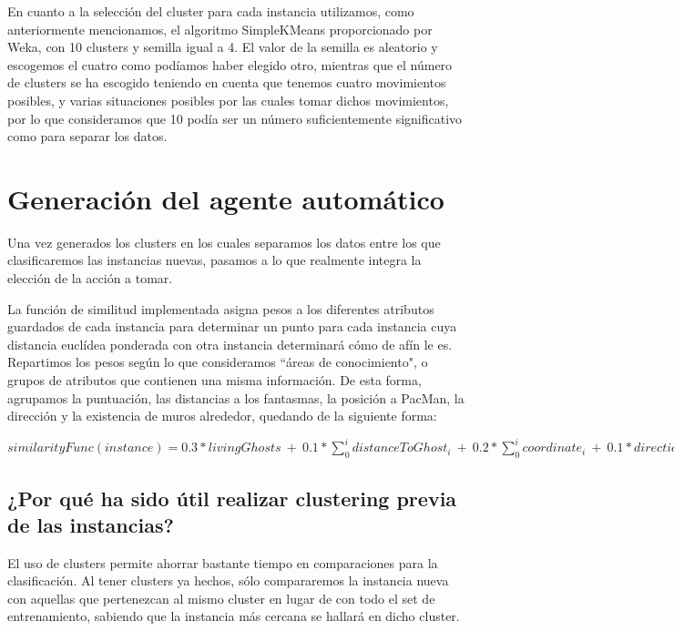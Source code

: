 \documentclass[12pt]{article}
\begin{document}
En cuanto a la selección del cluster para cada instancia utilizamos, como anteriormente mencionamos, el algoritmo SimpleKMeans proporcionado por Weka, con 10 clusters y semilla igual a 4. El valor de la semilla es aleatorio y escogemos el cuatro como podíamos haber elegido otro, mientras que el número de clusters se ha escogido teniendo en cuenta que tenemos cuatro movimientos posibles, y varias situaciones posibles por las cuales tomar dichos movimientos, por lo que consideramos que 10 podía ser un número suficientemente significativo como para separar los datos.

\section{Generación del agente automático}

Una vez generados los clusters en los cuales separamos los datos entre los que clasificaremos las instancias nuevas, pasamos a lo que realmente integra la elección de la acción a tomar.


La función de similitud implementada asigna pesos a los diferentes atributos guardados de cada instancia para determinar un punto para cada instancia cuya distancia euclídea ponderada con otra instancia determinará cómo de afín le es. Repartimos los pesos según lo que consideramos ``áreas de conocimiento", o grupos de atributos que contienen una misma información. De esta forma, agrupamos la puntuación, las distancias a los fantasmas, la posición a PacMan, la dirección y la existencia de muros alrededor, quedando de la siguiente forma:
\begin{center}
    $ similarityFunc(instance) = 0.3 * livingGhosts\ +\ 0.1 * \sum\limits_{0}^{i} distanceToGhost_i\ +\ 0.2 * \sum\limits_{0}^{i} coordinate_i\ +\ 0.1 * directionValue\ +\ 0.3 * \sum\limits_{0}^{i} thereIsWall_i $
\end{center}

\newpage

\subsection{¿Por qué ha sido útil realizar clustering previa de las instancias?}

El uso de clusters permite ahorrar bastante tiempo en comparaciones para la clasificación. Al tener clusters ya hechos, sólo compararemos la instancia nueva con aquellas que pertenezcan al mismo cluster en lugar de con todo el set de entrenamiento, sabiendo que la instancia más cercana se hallará en dicho cluster.
\end{document}

